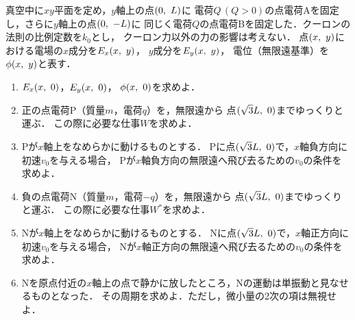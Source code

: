\documentclass[../../../uem_phy_std_q.tex]{subfiles}
\begin{document}
    真空中に$xy$平面を定め，$y$軸上の点$(0,\hspace{3.4pt} L)$に%
    電荷$Q\,(Q>0)$の点電荷Aを固定し，さらに$y$軸上の点$(0,\hspace{3.4pt} -L)$に%
    同じく電荷$Q$の点電荷Bを固定した．クーロンの法則の比例定数を$k_0$とし，%
    クーロン力以外の力の影響は考えない．%
    点$(x,\hspace{3.4pt} y)$における電場の$x$成分を$E_x(x,\hspace{3.4pt} y)$，%
    $y$成分を$E_y(x,\hspace{3.4pt} y)$，%
    電位（無限遠基準）を$\phi(x,\hspace{3.4pt} y)$と表す．%

    \begin{enumerate}
        \item%
            $E_x(x,\hspace{3.4pt} 0)$，$E_y(x,\hspace{3.4pt} 0)$，%
            $\phi(x,\hspace{3.4pt} 0)$を求めよ．
        \item%
            正の点電荷P（質量$m$，電荷$q$）を，無限遠から%
            点$(\sqrt{3}L, \hspace{3.4pt} 0)$までゆっくりと運ぶ．%
            この際に必要な仕事$W$を求めよ．
        \item%
            Pが$x$軸上をなめらかに動けるものとする．%
            Pに点$(\sqrt{3}L, \hspace{3.4pt} 0)$で，$x$軸負方向に初速$v_0$を与える場合，%
            Pが$x$軸負方向の無限遠へ飛び去るための$v_0$の条件を求めよ．
        \item%
            負の点電荷N（質量$m$，電荷$-q$）を，無限遠から%
            点$(\sqrt{3}L, \hspace{3.4pt} 0)$までゆっくりと運ぶ．%
            この際に必要な仕事$W^*$を求めよ．
        \item%
            Nが$x$軸上をなめらかに動けるものとする．%
            Nに点$(\sqrt{3}L, \hspace{3.4pt} 0)$で，$x$軸正方向に初速$v_0$を与える場合，%
            Nが$x$軸正方向の無限遠へ飛び去るための$v_0$の条件を求めよ．
        \item%
            Nを原点付近の$x$軸上の点で静かに放したところ，Nの運動は単振動と見なせるものとなった．%
            その周期を求めよ．ただし，微小量の2次の項は無視せよ．
    \end{enumerate}
\end{document}
